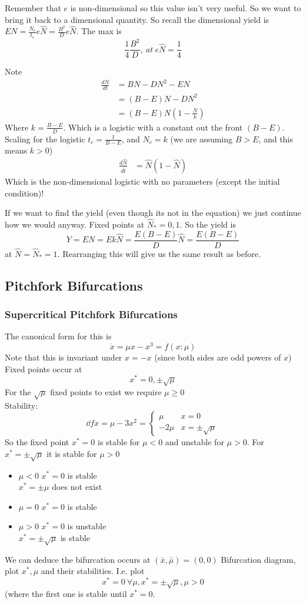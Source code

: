 \documentclass{/home/janmebows/Documents/LatexTemplates/myassignment}
\begin{document}
Remember that $e$ is non-dimensional so this value isn't very useful. So we want to bring it back to a dimensional quantity. So recall the dimensional yield is $EN = \frac{N_c}{t_c} e\hat{N} = \frac{B^2}{D} e \hat{N}$.
The max is
\[\frac14 \frac{B^2}{D}, \ at \ e\hat{N} = \frac14\]


Note
\begin{align*}
\frac{dN}{dt} &= BN - DN^2 - EN\\
&= (B-E)N - DN^2\\
&= (B-E)N(1- \frac{N}{k})
\end{align*}
Where $k = \frac{B-E}{D}$. Which is a logistic with a constant out the front $(B-E)$. Scaling for the logistic $t_c = \frac{1}{B-E}$, and $N_c = k$ (we are assuming $B > E$, and this means $k > 0$)
\begin{align*}
    \frac{d\hat{N}}{d\hat{t}} &= \hat{N}(1-\hat{N})
\end{align*}
Which is the non-dimensional logistic with no parameters (except the initial condition)!

If we want to find the yield (even though its not in the equation) we just continue how we would anyway.
Fixed points at $\hat{N}_* = 0,1$. So the yield is 
\[Y= EN = Ek\hat{N} = \frac{E(B-E)}{D} \hat{N} = \frac{E(B-E)}{D} \]
at $\hat{N} = \hat{N}_* = 1$. Rearranging this will give us the same result as before.

\subsection{Pitchfork Bifurcations}

\subsubsection{Supercritical Pitchfork Bifurcations}
The canonical form for this is
\[\dot{x} = \mu x - x^3 = f(x:\mu)\]
Note that this is invariant under $x = -x$ (since both sides are odd powers of $x$)
Fixed points occur at
\[x^* = 0, \pm \sqrt{\mu}\]
For the $\sqrt{\mu}$ fixed points to exist we require $\mu \geq 0$\\
Stability:
\[\dd fx = \mu - 3x^2 = \begin{cases}\mu & x=0\\ -2\mu & x=\pm\sqrt{\mu}\end{cases}\]
So the fixed point $x^* = 0$ is stable for $\mu < 0$ and unstable for $\mu >0$. For $x^* = \pm \sqrt{\mu}$ it is stable for $\mu > 0$
\begin{itemize}
    \item $\mu < 0$
    $x^* = 0$ is stable\\
    $x^* = \pm \mu$ does not exist
    \item $\mu = 0$
    $x^* = 0$ is stable
    \item $\mu > 0$
    $x^* =0 $ is unstable\\
    $x^* = \pm \sqrt{\mu}$ is stable
\end{itemize}
We can deduce the bifurcation occurs at $(\bar{x},\bar{\mu}) = (0,0)$
Bifurcation diagram, plot $x^*,\mu$ and their stabilities.
I.e. plot
\[x^* = 0\ \forall \mu, x^* = \pm\sqrt{\mu}, \mu >0\]
(where the first one is stable until $x^*=0$.
\end{document}

